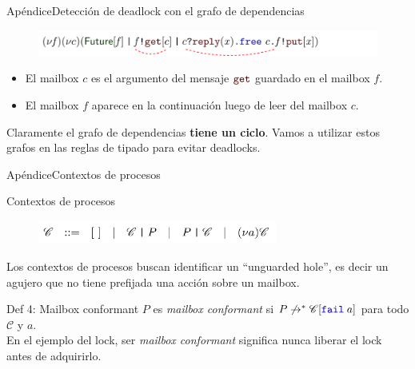 \documentclass{beamer}
\newcommand{\msgtag}[1]{\texttt{\textcolor{msg-color}{#1}}}
\newcommand{\fail}[1]{\texttt{\textcolor{keyword}{fail}}\hspace{0.25em}#1}
\begin{document}
\begin{frame}{Apéndice}{Detección de deadlock con el grafo de dependencias}
    \begin{figure}[H]
        \includegraphics[width=\textwidth]{dependency-graph-example}
    \end{figure}

    \begin{itemize}
        \item El mailbox $c$ es el argumento del mensaje $\msgtag{get}$ guardado en el mailbox $f$.
        \item El mailbox $f$ aparece en la continuación luego de leer del mailbox $c$.
    \end{itemize}

    \vspace{-1em}
    \begin{figure}
        \centering
    \end{figure}
    \vspace{-1em}

    Claramente el grafo de dependencias \textbf{tiene un ciclo}. Vamos a utilizar estos grafos en las reglas de tipado para evitar deadlocks.
\end{frame}

\begin{frame}{Apéndice}{Contextos de procesos}
    \begin{block}{Contextos de procesos}
        \vspace{-0.5em}
        \begin{figure}[H]
            \includegraphics[width=0.7\textwidth,left]{process-context}
        \end{figure}
        \vspace{-1em}
        Los contextos de procesos buscan identificar un ``unguarded hole'', es decir un agujero que no tiene prefijada una acción sobre un mailbox.
    \end{block}
    \begin{block}{Def 4: Mailbox conformant}
        $P$ es \emph{mailbox conformant} si $P \not\rightarrow^\ast \mathscr{C}[\fail{a}]$ para todo $\mathscr{C}$ y $a$.
        \\
        En el ejemplo del lock, ser \emph{mailbox conformant} significa nunca liberar el lock antes de adquirirlo.
    \end{block}
\end{frame}
\end{document}
